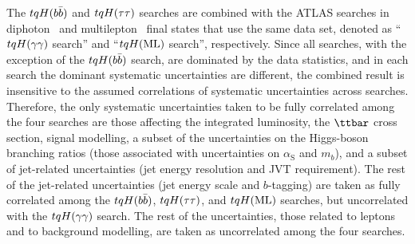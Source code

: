 The $tqH(b\bar{b})$ and $tqH(\tau\tau)$ searches are combined with the ATLAS searches in 
diphoton~\cite{Aaboud:2017mfd} and multilepton~\cite{Aaboud:2018pob} final states that use the same data set, 
denoted as ``$tqH(\gamma\gamma)$ search'' and ``$tqH(\mathrm{ML})$ search'', respectively.
Since all searches, with the exception of the $tqH(b\bar{b})$ search, are dominated by the data statistics, 
and in each search the dominant systematic uncertainties are different, the combined result is 
insensitive to the assumed correlations of systematic uncertainties across searches.
Therefore, the only systematic uncertainties taken to be fully correlated among the four searches are 
those affecting the integrated luminosity, the $\ttbar$ cross section, signal modelling, a subset of the uncertainties
on the Higgs-boson branching ratios (those associated with uncertainties on $\alpha_\mathrm{S}$ and $m_b$), 
and a subset of jet-related uncertainties (jet energy resolution and JVT requirement). 
The rest of the jet-related uncertainties (jet energy scale and $b$-tagging) are taken as fully correlated among 
the $tqH(b\bar{b})$, $tqH(\tau\tau)$, and $tqH(\mathrm{ML})$ searches, but uncorrelated with the $tqH(\gamma\gamma)$ search. The rest of the uncertainties, 
those related to leptons and to background modelling, are taken as uncorrelated among the four searches. 



